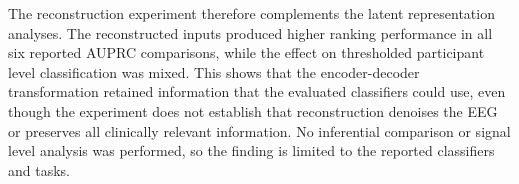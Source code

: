 The reconstruction experiment therefore complements the latent representation
analyses. The reconstructed inputs produced higher ranking performance in all
six reported AUPRC comparisons, while the effect on thresholded
participant level classification was mixed. This shows that the
encoder-decoder transformation retained information that the evaluated
classifiers could use, even though the experiment does not establish that
reconstruction denoises the EEG or preserves all clinically relevant
information. No inferential comparison or signal level analysis was performed,
so the finding is limited to the reported classifiers and tasks.




